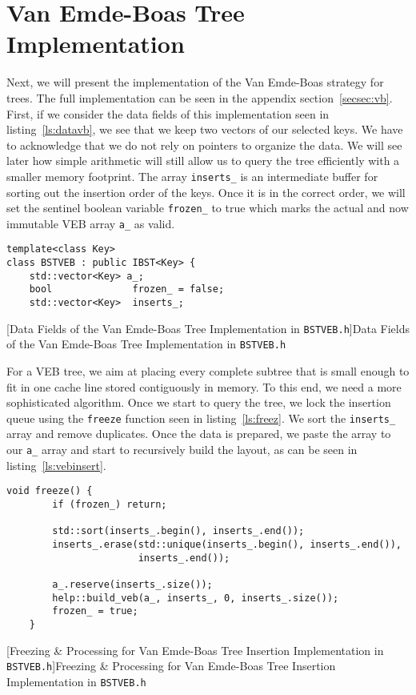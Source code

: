 \documentclass{article}
\begin{document}
\section{Van Emde-Boas Tree Implementation}
\label{sec:vb}
Next, we will present the implementation of the Van Emde-Boas strategy for trees. The full implementation can be seen in the appendix section~\ref{secsec:vb}. First, if we consider the data fields of this implementation seen in listing~\ref{ls:datavb}, we see that we keep two vectors of our selected keys. We have to acknowledge that we do not rely on pointers to organize the data. We will see later how simple arithmetic will still allow us to query the tree efficiently with a smaller memory footprint.  The array \texttt{inserts\_} is an intermediate buffer for sorting out the insertion order of the keys. Once it is in the correct order, we will set the sentinel boolean variable \texttt{frozen\_} to true which marks the actual and now immutable VEB array \texttt{a\_} as valid.
\begin{lstlisting}
template<class Key>
class BSTVEB : public IBST<Key> {
    std::vector<Key> a_;            
    bool              frozen_ = false;
    std::vector<Key>  inserts_; 
\end{lstlisting}
[Data Fields of the Van Emde-Boas Tree Implementation in \texttt{BSTVEB.h}]{Data Fields of the Van Emde-Boas Tree Implementation in \texttt{BSTVEB.h}}
\label{ls:datavb}

For a VEB tree, we aim at placing every complete subtree that is small enough to fit in one cache line stored contiguously in memory. To this end, we need a more sophisticated algorithm. Once we start to query the tree, we lock the insertion queue using the \texttt{freeze} function seen in listing~\ref{ls:freez}. We sort the \texttt{inserts\_} array and remove duplicates. Once the data is prepared, we paste the array to our \texttt{a\_} array and start to recursively build the layout, as can be seen in listing~\ref{ls:vebinsert}.
\begin{lstlisting}
void freeze() {
        if (frozen_) return;

        std::sort(inserts_.begin(), inserts_.end());
        inserts_.erase(std::unique(inserts_.begin(), inserts_.end()),
                       inserts_.end());

        a_.reserve(inserts_.size());
        help::build_veb(a_, inserts_, 0, inserts_.size());
        frozen_ = true;
    }
\end{lstlisting}
[Freezing \& Processing for Van Emde-Boas Tree Insertion Implementation in \texttt{BSTVEB.h}]{Freezing \& Processing for Van Emde-Boas Tree Insertion Implementation in \texttt{BSTVEB.h}}
\label{ls:freez}
\end{document}

